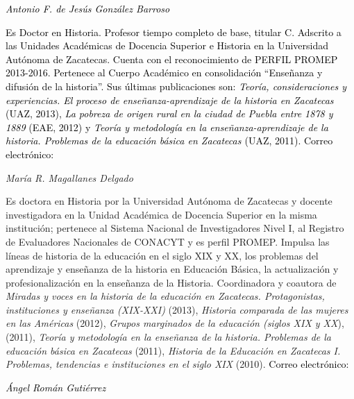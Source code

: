 \bigskip

{ 
\textit{\textcolor{black}{Antonio F. de Jesús González Barroso}}}

{ 
\textcolor{black}{Es Doctor en Historia. Profesor tiempo completo de base,
titular C. Adscrito a las Unidades Académicas de Docencia Superior e
Historia en la Universidad Autónoma de Zacatecas. Cuenta con el
reconocimiento de PERFIL PROMEP 2013-2016. Pertenece al Cuerpo Académico en
consolidación “Enseñanza y difusión de la historia”. Sus últimas
publicaciones son: }\textit{\textcolor{black}{Teoría, consideraciones y
experiencias. El proceso de enseñanza-aprendizaje de la historia en
Zacatecas }}\textcolor{black}{(UAZ, 2013), }\textit{\textcolor{black}{La
pobreza de origen rural en la ciudad de Puebla entre 1878 y
1889}}\textcolor{black}{ (EAE, 2012) y }\textit{\textcolor{black}{Teoría y
metodología en la enseñanza-aprendizaje de la historia. Problemas de la
educación básica en Zacatecas }}\textcolor{black}{(UAZ, 2011). Correo
electrónico:}\textit{\textcolor{black}{
}}\href{mailto:jacobino@prodigy.net.mx}{\textstyleInternetlink{\textit{\textcolor{black}{jacobino@prodigy.net.mx}}}}}


\bigskip

{ 
\textit{María R. Magallanes Delgado}}

{ 
Es doctora en Historia por la Universidad Autónoma de Zacatecas y docente
investigadora en la Unidad Académica de Docencia Superior en la misma
institución; pertenece al Sistema Nacional de Investigadores Nivel I,  al
Registro de Evaluadores Nacionales de CONACYT y es perfil PROMEP. Impulsa
las líneas de historia de la educación en el siglo XIX y XX, los problemas
del aprendizaje y enseñanza de la historia en Educación Básica, la
actualización y profesionalización en la enseñanza de la Historia.
Coordinadora y coautora de \textit{Miradas y voces en la historia de la
educación en Zacatecas. Protagonistas, instituciones y enseñanza (XIX-XXI)
}(2013), \textit{Historia comparada de las mujeres en las Américas }(2012),
\textit{Grupos marginados de la educación (siglos XIX y XX}), (2011),
\textit{Teoría y metodología en la enseñanza de la historia. Problemas de
la educación básica en Zacatecas} (2011), \textit{Historia de la Educación
en Zacatecas I. Problemas, tendencias e instituciones en el siglo XIX}
(2010). \textcolor{black}{Correo electrónico:
}\href{mailto:rmdhistoria@yahoo.com.mx}{}}


\bigskip

{ 
\textit{\textcolor{black}{Ángel Román Gutiérrez}}}

